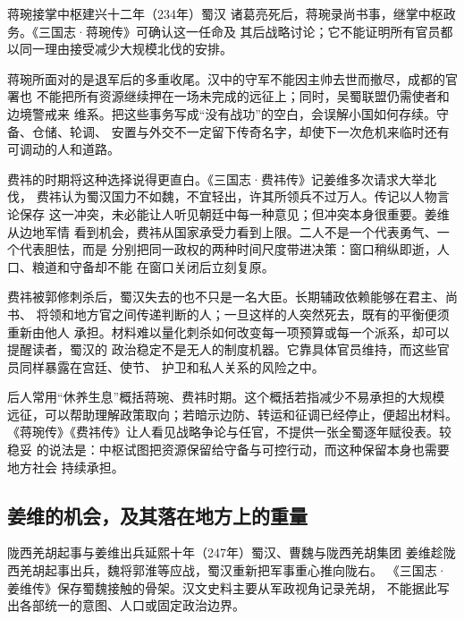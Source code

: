 \begin{event}{蒋琬接掌中枢}{建兴十二年（234年）}{蜀汉}{}
诸葛亮死后，蒋琬录尚书事，继掌中枢政务。《三国志·蒋琬传》可确认这一任命及
其后战略讨论；它不能证明所有官员都以同一理由接受减少大规模北伐的安排。
\end{event}

蒋琬所面对的是退军后的多重收尾。汉中的守军不能因主帅去世而撤尽，成都的官署也
不能把所有资源继续押在一场未完成的远征上；同时，吴蜀联盟仍需使者和边境警戒来
维系。把这些事务写成“没有战功”的空白，会误解小国如何存续。守备、仓储、轮调、
安置与外交不一定留下传奇名字，却使下一次危机来临时还有可调动的人和道路。

费祎的时期将这种选择说得更直白。《三国志·费祎传》记姜维多次请求大举北伐，
费祎认为蜀汉国力不如魏，不宜轻出，许其所领兵不过万人。传记以人物言论保存
这一冲突，未必能让人听见朝廷中每一种意见；但冲突本身很重要。姜维从边地军情
看到机会，费祎从国家承受力看到上限。二人不是一个代表勇气、一个代表胆怯，而是
分别把同一政权的两种时间尺度带进决策：窗口稍纵即逝，人口、粮道和守备却不能
在窗口关闭后立刻复原。

费祎被郭修刺杀后，蜀汉失去的也不只是一名大臣。长期辅政依赖能够在君主、尚书、
将领和地方官之间传递判断的人；一旦这样的人突然死去，既有的平衡便须重新由他人
承担。材料难以量化刺杀如何改变每一项预算或每一个派系，却可以提醒读者，蜀汉的
政治稳定不是无人的制度机器。它靠具体官员维持，而这些官员同样暴露在宫廷、使节、
护卫和私人关系的风险之中。

\begin{debate}
后人常用“休养生息”概括蒋琬、费祎时期。这个概括若指减少不易承担的大规模
远征，可以帮助理解政策取向；若暗示边防、转运和征调已经停止，便超出材料。
《蒋琬传》《费祎传》让人看见战略争论与任官，不提供一张全蜀逐年赋役表。较稳妥
的说法是：中枢试图把资源保留给守备与可控行动，而这种保留本身也需要地方社会
持续承担。
\end{debate}

\subsection{姜维的机会，及其落在地方上的重量}

\begin{event}{陇西羌胡起事与姜维出兵}{延熙十年（247年）}{蜀汉、曹魏与陇西羌胡集团}{}
姜维趁陇西羌胡起事出兵，魏将郭淮等应战，蜀汉重新把军事重心推向陇右。
《三国志·姜维传》保存蜀魏接触的骨架。汉文史料主要从军政视角记录羌胡，
不能据此写出各部统一的意图、人口或固定政治边界。
\end{event}

